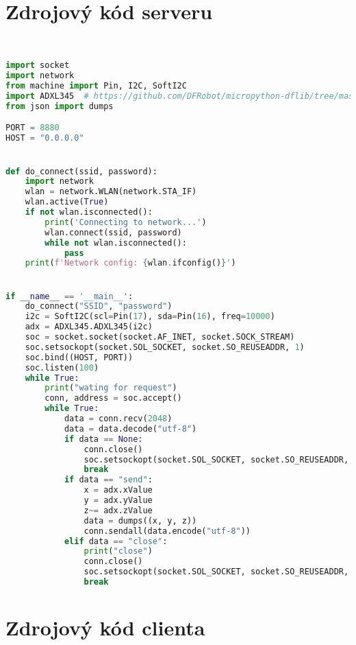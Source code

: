 \documentclass[12pt]{report}			%
\begin{document}
	\nocite{*}
    	\printbibliography					
    \printglossary[title={Zkratky}]		
    \listoffigures					
						

    \begin{appendices}
	\chapter{Zdrojový kód serveru}
	
\begin{lstlisting}[title={Program server.py}, caption={server.py},  label={lst:server}, language=Python]


import socket
import network
from machine import Pin, I2C, SoftI2C
import ADXL345  # https://github.com/DFRobot/micropython-dflib/tree/master/ADXL345
from json import dumps

PORT = 8880
HOST = "0.0.0.0"


def do_connect(ssid, password):
    import network
    wlan = network.WLAN(network.STA_IF)
    wlan.active(True)
    if not wlan.isconnected():
        print('Connecting to network...')
        wlan.connect(ssid, password)
        while not wlan.isconnected():
            pass
    print(f'Network config: {wlan.ifconfig()}')


if __name__ == '__main__':
    do_connect("SSID", "password")
    i2c = SoftI2C(scl=Pin(17), sda=Pin(16), freq=10000)
    adx = ADXL345.ADXL345(i2c)
    soc = socket.socket(socket.AF_INET, socket.SOCK_STREAM)
    soc.setsockopt(socket.SOL_SOCKET, socket.SO_REUSEADDR, 1)
    soc.bind((HOST, PORT))
    soc.listen(100)
    while True:
        print("wating for request")
        conn, address = soc.accept()
        while True:
            data = conn.recv(2048)
            data = data.decode("utf-8")
            if data == None:
                conn.close()
                soc.setsockopt(socket.SOL_SOCKET, socket.SO_REUSEADDR, 1)
                break
            if data == "send":
                x = adx.xValue
                y = adx.yValue
                z~= adx.zValue
                data = dumps((x, y, z))
                conn.sendall(data.encode("utf-8"))
            elif data == "close":
                print("close")
                conn.close()
                soc.setsockopt(socket.SOL_SOCKET, socket.SO_REUSEADDR, 1)
                break


\end{lstlisting}

	\chapter{Zdrojový kód clienta}


\end{appendices}
\end{document}
